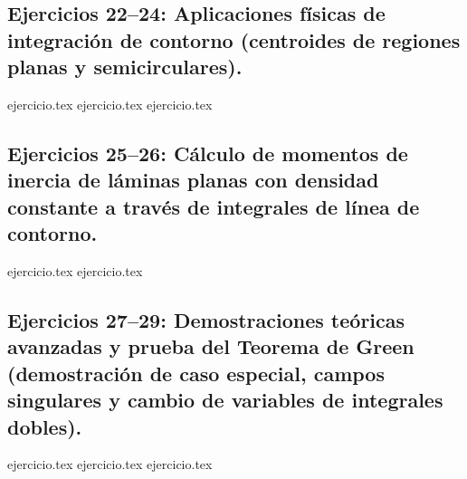 \subsection*{Ejercicios 22--24: Aplicaciones físicas de integración de contorno (centroides de regiones planas y semicirculares).}
\begin{enumerate}
    \setcounter{enumi}{21}
    {ejercicio.tex}
    {ejercicio.tex}
    {ejercicio.tex}
\end{enumerate}

\subsection*{Ejercicios 25--26: Cálculo de momentos de inercia de láminas planas con densidad constante a través de integrales de línea de contorno.}
\begin{enumerate}
    \setcounter{enumi}{24}
    {ejercicio.tex}
    {ejercicio.tex}
\end{enumerate}

\subsection*{Ejercicios 27--29: Demostraciones teóricas avanzadas y prueba del Teorema de Green (demostración de caso especial, campos singulares y cambio de variables de integrales dobles).}
\begin{enumerate}
    \setcounter{enumi}{26}
    {ejercicio.tex}
    {ejercicio.tex}
    {ejercicio.tex}
\end{enumerate}
